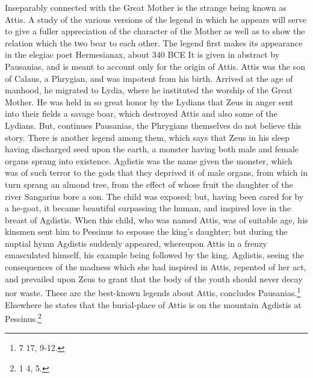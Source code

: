 \documentclass[a4paper, 11pt, oneside, polutonikogreek, french]{article}
\begin{document}
Inseparably connected with the Great Mother is the strange being known as Attis. A study of the various versions of the legend in which he appears will serve to give a fuller appreciation of the character of the Mother as well as to show the relation which the two bear to each other. The legend first makes its appearance in the elegiac poet Hermesianax, about 340 \textsc{BCE} It is given in abstract by Pausanias, and is meant to account only for the origin of Attis. Attis was the son of Calaus, a Phrygian, and was impotent from his birth. Arrived at the age of manhood, he migrated to Lydia, where he instituted the worship of the Great Mother. He was held in so great honor by the Lydians that Zeus in anger sent into their fields a savage boar, which destroyed Attis and also some of the Lydians. But, continues Pausanias, the Phrygians themselves do not believe this story. There is another legend among them, which says that Zeus in his sleep having discharged seed upon the earth, a monster having both male and female organs sprang into existence. Agdistis was the name given the monster, which was of such terror to the gods that they deprived it of male organs, from which in turn sprang an almond tree, from the effect of whose fruit the daughter of the river Sangarius bore a son. The child was exposed; but, having been cared for by a he-goat, it became beautiful surpassing the human, and inspired love in the breast of Agdistis. When this child, who was named Attis, was of suitable age, his kinsmen sent him to Pessinus to espouse the king's daughter; but during the nuptial hymn Agdistis suddenly appeared, whereupon Attis in a frenzy emasculated himself, his example being followed by the king. Agdistis, seeing the consequences of the madness which she had inspired in Attis, repented of her act, and prevailed upon Zeus to grant that the body of the youth should never decay nor waste. These are the best-known legends about Attis, concludes Pausanias.\footnote{7 17, 9-12.} Elsewhere he states that the burial-place of Attis is on the mountain Agdistis at Pessinus.\footnote{1 4, 5.}
\end{document}
